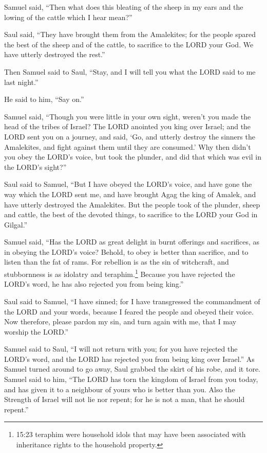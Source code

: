  Samuel said, ``Then what does this bleating of the sheep
in my ears and the lowing of the cattle which I hear mean?''

 Saul said, ``They have brought them from the Amalekites;
for the people spared the best of the sheep and of the cattle, to
sacrifice to the LORD your God. We have utterly destroyed the rest.''

 Then Samuel said to Saul, ``Stay, and I will tell you what
the LORD said to me last night.''

He said to him, ``Say on.''

 Samuel said, ``Though you were little in your own sight,
weren't you made the head of the tribes of Israel? The LORD anointed you
king over Israel;  and the LORD sent you on a journey, and
said, `Go, and utterly destroy the sinners the Amalekites, and fight
against them until they are consumed.'  Why then didn't you
obey the LORD's voice, but took the plunder, and did that which was evil
in the LORD's sight?''

 Saul said to Samuel, ``But I have obeyed the LORD's voice,
and have gone the way which the LORD sent me, and have brought Agag the
king of Amalek, and have utterly destroyed the Amalekites. 
But the people took of the plunder, sheep and cattle, the best of the
devoted things, to sacrifice to the LORD your God in Gilgal.''

 Samuel said, ``Has the LORD as great delight in burnt
offerings and sacrifices, as in obeying the LORD's voice? Behold, to
obey is better than sacrifice, and to listen than the fat of rams.
 For rebellion is as the sin of witchcraft, and
stubbornness is as idolatry and teraphim.\footnote{15:23 teraphim were
  household idols that may have been associated with inheritance rights
  to the household property.} Because you have rejected the LORD's word,
he has also rejected you from being king.''

 Saul said to Samuel, ``I have sinned; for I have
transgressed the commandment of the LORD and your words, because I
feared the people and obeyed their voice.  Now therefore,
please pardon my sin, and turn again with me, that I may worship the
LORD.''

 Samuel said to Saul, ``I will not return with you; for you
have rejected the LORD's word, and the LORD has rejected you from being
king over Israel.''  As Samuel turned around to go away,
Saul grabbed the skirt of his robe, and it tore.  Samuel
said to him, ``The LORD has torn the kingdom of Israel from you today,
and has given it to a neighbour of yours who is better than you.
 Also the Strength of Israel will not lie nor repent; for
he is not a man, that he should repent.''


